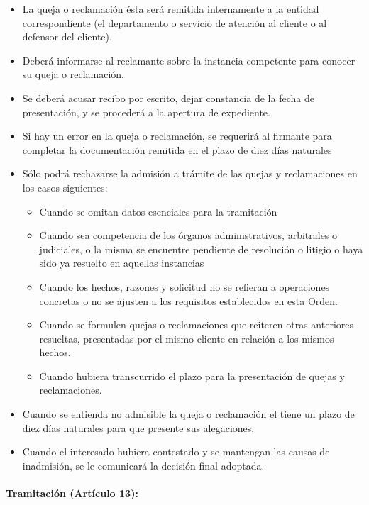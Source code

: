 \documentclass[
]{article}
\providecommand{\tightlist}{%
  \setlength{\itemsep}{0pt}\setlength{\parskip}{0pt}}
\begin{document}
\begin{itemize}
\tightlist
\item
  La queja o reclamación ésta será remitida internamente a la entidad
  correspondiente (el departamento o servicio de atención al cliente o
  al defensor del cliente).
\item
  Deberá informarse al reclamante sobre la instancia competente para
  conocer su queja o reclamación.
\item
  Se deberá acusar recibo por escrito, dejar constancia de la fecha de
  presentación, y se procederá a la apertura de expediente.
\item
  Si hay un error en la queja o reclamación, se requerirá al firmante
  para completar la documentación remitida en el plazo de diez días
  naturales
\item
  Sólo podrá rechazarse la admisión a trámite de las quejas y
  reclamaciones en los casos siguientes:

  \begin{itemize}
  \tightlist
  \item
    Cuando se omitan datos esenciales para la tramitación
  \item
    Cuando sea competencia de los órganos administrativos, arbitrales o
    judiciales, o la misma se encuentre pendiente de resolución o
    litigio o haya sido ya resuelto en aquellas instancias
  \item
    Cuando los hechos, razones y solicitud no se refieran a operaciones
    concretas o no se ajusten a los requisitos establecidos en esta
    Orden.
  \item
    Cuando se formulen quejas o reclamaciones que reiteren otras
    anteriores resueltas, presentadas por el mismo cliente en relación a
    los mismos hechos.
  \item
    Cuando hubiera transcurrido el plazo para la presentación de quejas
    y reclamaciones.
  \end{itemize}
\item
  Cuando se entienda no admisible la queja o reclamación el tiene un
  plazo de diez días naturales para que presente sus alegaciones.
\item
  Cuando el interesado hubiera contestado y se mantengan las causas de
  inadmisión, se le comunicará la decisión final adoptada.
\end{itemize}

\hypertarget{tramitaciuxf3n-artuxedculo-13}{%
\paragraph{\texorpdfstring{Tramitación (\textbf{Artículo
13}):}{Tramitación (Artículo 13):}}\label{tramitaciuxf3n-artuxedculo-13}}
\end{document}

